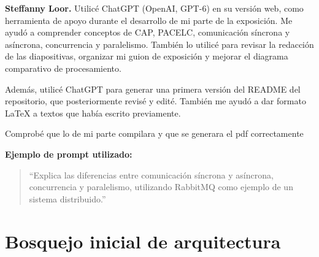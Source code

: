 \documentclass[11pt,a4paper]{article}
\begin{document}
\medskip
\noindent\textbf{Steffanny Loor.} Utilicé ChatGPT (OpenAI, GPT-6) en su versión web,
como herramienta de apoyo durante
el desarrollo de mi parte de la exposición.
Me ayudó a comprender conceptos de CAP, PACELC,
comunicación síncrona y asíncrona, concurrencia y
paralelismo. También lo utilicé para revisar la
redacción de las diapositivas, organizar mi guion
de exposición y mejorar el diagrama comparativo
de procesamiento.

Además, utilicé ChatGPT para generar una primera
versión del README del repositorio, que posteriormente
revisé y edité. También me ayudó a dar formato
\LaTeX{} a textos que había escrito previamente.

Comprobé que lo de mi parte compilara y que se generara el pdf
correctamente

\medskip
\noindent\textbf{Ejemplo de prompt utilizado:}
\begin{quote}
``Explica las diferencias entre comunicación síncrona
y asíncrona, concurrencia y paralelismo, utilizando
RabbitMQ como ejemplo de un sistema distribuido.''
\end{quote}

\section*{Bosquejo inicial de arquitectura}


\printbibliography
\end{document}
